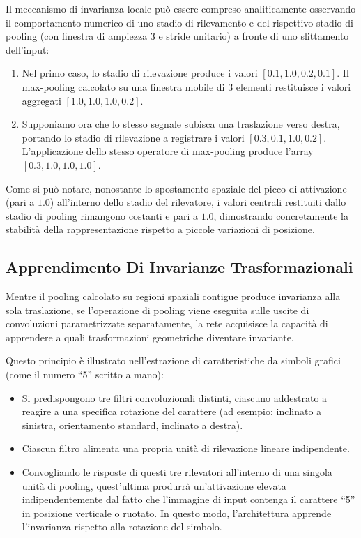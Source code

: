﻿\documentclass[11pt, a4paper]{article}
\begin{document}
Il meccanismo di invarianza locale può essere compreso analiticamente osservando il comportamento numerico di uno stadio di rilevamento e del rispettivo stadio di pooling (con finestra di ampiezza 3 e stride unitario) a fronte di uno slittamento dell'input:
\begin{enumerate}
    \item Nel primo caso, lo stadio di rilevazione produce i valori $[0.1, 1.0, 0.2, 0.1]$. Il max-pooling calcolato su una finestra mobile di 3 elementi restituisce i valori aggregati $[1.0, 1.0, 1.0, 0.2]$.
    \item Supponiamo ora che lo stesso segnale subisca una traslazione verso destra, portando lo stadio di rilevazione a registrare i valori $[0.3, 0.1, 1.0, 0.2]$. L'applicazione dello stesso operatore di max-pooling produce l'array $[0.3, 1.0, 1.0, 1.0]$.
\end{enumerate}
Come si può notare, nonostante lo spostamento spaziale del picco di attivazione (pari a $1.0$) all'interno dello stadio del rilevatore, i valori centrali restituiti dallo stadio di pooling rimangono costanti e pari a $1.0$, dimostrando concretamente la stabilità della rappresentazione rispetto a piccole variazioni di posizione.

\subsection{Apprendimento Di Invarianze Trasformazionali}

Mentre il pooling calcolato su regioni spaziali contigue produce invarianza alla sola traslazione, se l'operazione di pooling viene eseguita sulle uscite di convoluzioni parametrizzate separatamente, la rete acquisisce la capacità di apprendere a quali trasformazioni geometriche diventare invariante.


Questo principio è illustrato nell'estrazione di caratteristiche da simboli grafici (come il numero ``5'' scritto a mano):
\begin{itemize}
    \item Si predispongono tre filtri convoluzionali distinti, ciascuno addestrato a reagire a una specifica rotazione del carattere (ad esempio: inclinato a sinistra, orientamento standard, inclinato a destra).
    \item Ciascun filtro alimenta una propria unità di rilevazione lineare indipendente.
    \item Convogliando le risposte di questi tre rilevatori all'interno di una singola unità di pooling, quest'ultima produrrà un'attivazione elevata indipendentemente dal fatto che l'immagine di input contenga il carattere ``5'' in posizione verticale o ruotato. In questo modo, l'architettura apprende l'invarianza rispetto alla rotazione del simbolo.
\end{itemize}
\end{document}

